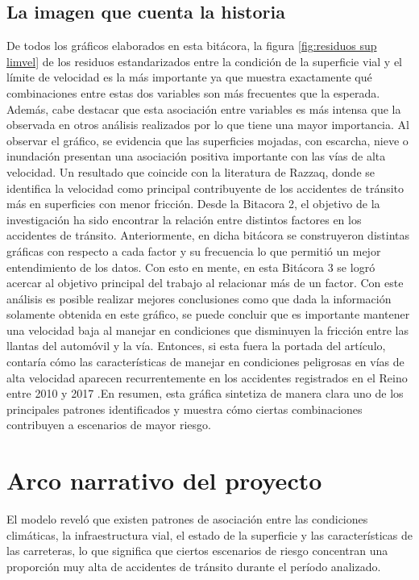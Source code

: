 \documentclass[12pt]{article}
\begin{document}
\subsection{La imagen que cuenta la historia}
  De todos los gráficos elaborados en esta bitácora, la figura \ref{fig:residuos sup limvel} 
de los residuos 
estandarizados entre la condición de la superficie vial y el límite de velocidad es 
la más importante ya que muestra exactamente qué combinaciones entre estas dos variables
son más frecuentes que la esperada. Además, cabe destacar que esta asociación entre 
variables es más intensa que la observada en otros análisis realizados por lo que 
tiene una mayor importancia. Al observar el gráfico, se evidencia que las superficies 
mojadas, con escarcha, nieve o inundación presentan una asociación positiva importante 
con las vías de alta velocidad. Un resultado que coincide con la literatura de Razzaq, 
donde se identifica la velocidad como principal contribuyente de los accidentes de 
tránsito más en superficies con menor fricción. 
  Desde la Bitacora 2, el objetivo de la investigación ha sido encontrar la relación 
entre distintos factores en los accidentes de tránsito. Anteriormente, en dicha bitácora 
se construyeron distintas gráficas con respecto a cada factor y su frecuencia lo 
que permitió un mejor entendimiento de los datos. Con esto en mente, en esta 
Bitácora 3 se logró acercar al objetivo principal del trabajo al relacionar 
más de un factor. Con este análisis es posible realizar mejores conclusiones 
como que dada la información solamente obtenida en este gráfico, se puede concluir 
que es importante mantener una velocidad baja al manejar en condiciones que disminuyen 
la fricción entre las llantas del automóvil y la vía. Entonces, si esta fuera la portada 
del artículo, contaría cómo las características de manejar en condiciones peligrosas en 
vías de alta velocidad aparecen recurrentemente en los accidentes registrados en el Reino 
entre 2010 y 2017 .En resumen, esta gráfica sintetiza de manera clara uno de los principales
patrones identificados y muestra cómo ciertas combinaciones contribuyen a escenarios de mayor riesgo.



\section{Arco narrativo del proyecto}
El modelo reveló que existen patrones de asociación entre las
condiciones climáticas, la infraestructura vial, el estado de la superficie 
y las características de las carreteras, lo que significa que ciertos 
escenarios de riesgo concentran una proporción muy alta de 
accidentes de tránsito durante el período analizado.
\end{document}
